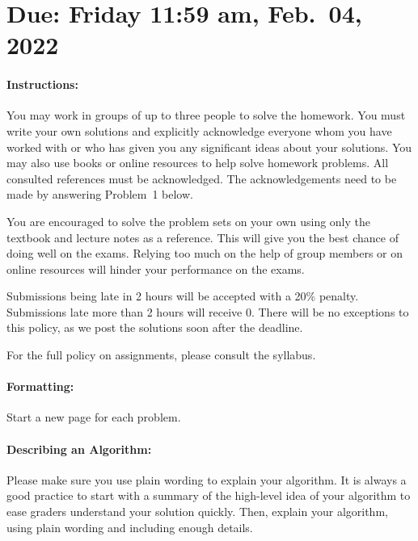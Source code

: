 \documentclass[11pt]{article}
\begin{document}
\maketitle

\section*{Due: Friday 11:59 am, Feb.\ 04, 2022}

\paragraph*{Instructions:}

You may work in groups of up to three people to solve the homework.
You must write your own solutions and explicitly acknowledge everyone whom 
you have worked with or who has given you any significant ideas about your solutions. 
You may also use books or online resources to help solve homework problems.  
All consulted references must be acknowledged. The acknowledgements need to be made by answering Problem~1 below.

You are encouraged to solve the problem sets on your own using only the textbook and lecture notes as a reference. This will give you the best chance of doing well on the exams. Relying too much on the help of group members or on online resources will hinder your performance on the exams.

Submissions being late in 2 hours will be accepted with a 20\% penalty. Submissions late more than 2 hours will receive 0. There will be no exceptions to this policy, as we post the solutions soon after the deadline. 

For the full policy on assignments, please consult the syllabus.

\paragraph*{Formatting:} Start a new page for each problem.

\paragraph*{Describing an Algorithm:} Please make sure you use plain wording to explain your algorithm. It is always a good practice to start with a summary of the high-level idea of your algorithm to ease graders understand your solution quickly. Then, explain your algorithm, using plain wording and including enough details.
\end{document}
